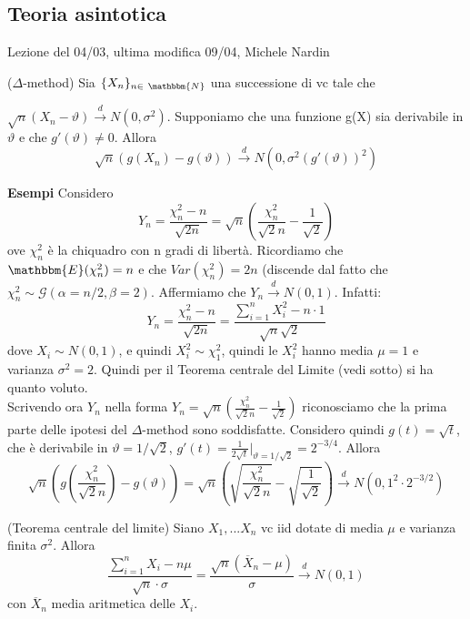 \subsection{Teoria asintotica}
Lezione del 04/03, ultima modifica 09/04, Michele Nardin

\begin{teo}
\noindent
($\Delta$-method) Sia $\{X_n\}_{n \in\ \mathbbm{N}}$ una successione di vc
tale che 

\noindent $\sqrt{n}(X_n-\vartheta)\stackrel{d}{\rightarrow}N(0,\sigma^2)$. 
Supponiamo che una funzione g(X) sia derivabile in $\vartheta$ e che $g'(\vartheta)\neq0$. Allora $$\sqrt{n}(g(X_n)-g(\vartheta))\stackrel{d}{\rightarrow}N(0,\sigma^2(g'(\vartheta))^2)$$
\end{teo}

\textbf{Esempi}
Considero $$Y_n=\frac{\chi^2_n-n}{\sqrt{2n}}=\sqrt{n}\left(\frac{\chi^2_n}{\sqrt{2}n}-\frac{1}{\sqrt{2}}\right)$$ ove $\chi^2_n$ è la chiquadro con n gradi di libertà. 
Ricordiamo che $\mathbbm{E}(\chi^2_n)=n$ e che $Var(\chi^2_n)=2n$ (discende dal fatto che $\chi^2_n \sim \mathcal{G}(\alpha=n/2,\beta=2)$. 
Affermiamo che $Y_n \stackrel{d}{\rightarrow} N(0,1)$. Infatti:
$$Y_n = \frac{\chi^2_n-n}{\sqrt{2n}} = \frac{\sum_{i=1}^n X_i^2 - n \cdot 1}{\sqrt{n} \sqrt{2}}$$
dove $X_i \sim N(0,1)$, e quindi $X_i^2 \sim \chi^2_1$, quindi le $X_i^2$ hanno media $\mu=1$ e varianza $\sigma^2=2$. Quindi per il Teorema centrale del Limite (vedi sotto) si ha quanto voluto.\\
Scrivendo ora $Y_n$ nella forma $Y_n=\sqrt{n}\left(\frac{\chi^2_n}{\sqrt{2}n}-\frac{1}{\sqrt{2}}\right)$ riconosciamo che la prima parte delle ipotesi del $\Delta$-method sono soddisfatte.
Considero quindi $g(t)=\sqrt{t}$, che è derivabile in $\vartheta=1/\sqrt{2}$, $g'(t)=\frac{1}{2\sqrt{t}}|_{\vartheta=1/\sqrt{2}}=2^{-3/4}$.
Allora $$\sqrt{n}(g\left(\frac{\chi^2_n}{\sqrt{2}n}\right)-g(\vartheta))=
\sqrt{n}\left(\sqrt{\frac{\chi^2_n}{\sqrt{2}n}}-\sqrt{\frac{1}{\sqrt{2}}}\right)
\stackrel{d}{\rightarrow}N(0,1^2\cdot 2^{-3/2})$$

\begin{teo}
(Teorema centrale del limite) Siano $X_1,...X_n$ vc iid dotate di media $\mu$ e varianza finita $\sigma^2$. Allora 
$$\frac{\sum_{i=1}^n X_i - n\mu}{\sqrt{n}\cdot \sigma} = \frac{\sqrt{n}(\overline{X}_n-\mu)}{\sigma}\stackrel{d}{\rightarrow}N(0,1)$$
con $\overline{X}_n$ media aritmetica delle $X_i$.
\end{teo}

